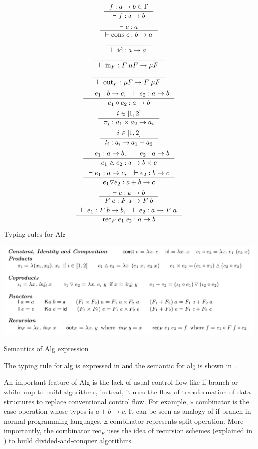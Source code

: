\begin{table}[ht]
    \[\inference{f : a -> b \in \Gamma}{|- f : a -> b}\]
    \[\inference{|- e : a}{|- \text{cons} \; e : b -> a}\]
    \[\inference{}{|- \text{id} : a -> a}\]
    \[\inference{}{|- \text{in}_F : F \; \mu F -> \mu F}\]
    \[\inference{}{|- \text{out}_F : \mu F -> F \; \mu F}\]
    \[\inference{|- e_1 : b -> c, \quad |- e_2 : a -> b}{e_1 \circ e_2: a -> b}\]
    \[\inference{i \in [1,2]}{\pi_i : a_1 \times a_2 -> a_i}\]
    \[\inference{i \in [1,2]}{l_i : a_i -> a_1 + a_2}\]
    \[\inference{|- e_1 : a -> b, \quad |- e_2 : a -> b}{e_1 \vartriangle e_2: a -> b \times c}\]
    \[\inference{|- e_1 : a -> c, \quad |- e_2 : b -> c}{e_1 \triangledown e_2: a + b -> c}\]
    \[\inference{|- e : a -> b}{F \; e : F \; a -> F \; b}\]
    \[\inference{|- e_1 : F \; b -> b, \quad |- e_2 : a -> F \; a}{\text{rec}_F \; e_1 \; e_2: a -> b}\]
    \caption{Typing rules for Alg}
    \label{project:typing}
\end{table}
\begin{table}[ht]
    \includegraphics[width=\textwidth]{project/semantics.png}
    \caption{Semantics of Alg expression\cite{AlgebraicMultipartyProtocol}} 
    \label{project:Semantics}
\end{table}

The typing rule for alg is expressed in  and the semantic for alg is shown in . 

An important feature of Alg is the lack of usual control flow like if branch or while loop to build algorithms, instead, it uses the flow of transformation of data structures to replace conventional control flow. For example, $\triangledown$ combinator is the case operation whose types is $a + b \rightarrow c$. It can be seen as analogy of if branch in normal programming languages. $\vartriangle$ combinator represents split operation. More importantly, the combinator $\text{rec}_F$ uses the idea of recursion schemes (explained in ) to build divided-and-conquer algorithms. 

